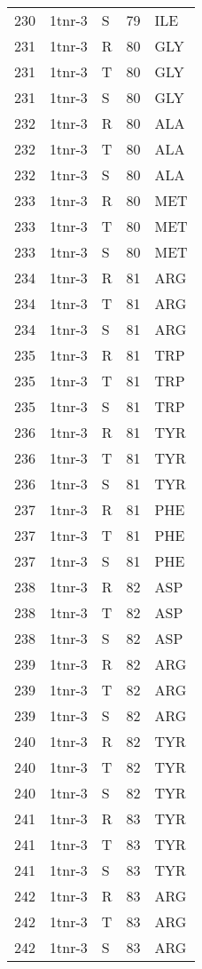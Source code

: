 \begin{tiny}
\begin{longtable}[l]{l|l|l|l|l}
	230 & 1tnr-3 & S & 79 & ILE \\
	231 & 1tnr-3 & R & 80 & GLY \\
	231 & 1tnr-3 & T & 80 & GLY \\
	231 & 1tnr-3 & S & 80 & GLY \\
	232 & 1tnr-3 & R & 80 & ALA \\
	232 & 1tnr-3 & T & 80 & ALA \\
	232 & 1tnr-3 & S & 80 & ALA \\
	233 & 1tnr-3 & R & 80 & MET \\
	233 & 1tnr-3 & T & 80 & MET \\
	233 & 1tnr-3 & S & 80 & MET \\
	234 & 1tnr-3 & R & 81 & ARG \\
	234 & 1tnr-3 & T & 81 & ARG \\
	234 & 1tnr-3 & S & 81 & ARG \\
	235 & 1tnr-3 & R & 81 & TRP \\
	235 & 1tnr-3 & T & 81 & TRP \\
	235 & 1tnr-3 & S & 81 & TRP \\
	236 & 1tnr-3 & R & 81 & TYR \\
	236 & 1tnr-3 & T & 81 & TYR \\
	236 & 1tnr-3 & S & 81 & TYR \\
	237 & 1tnr-3 & R & 81 & PHE \\
	237 & 1tnr-3 & T & 81 & PHE \\
	237 & 1tnr-3 & S & 81 & PHE \\
	238 & 1tnr-3 & R & 82 & ASP \\
	238 & 1tnr-3 & T & 82 & ASP \\
	238 & 1tnr-3 & S & 82 & ASP \\
	239 & 1tnr-3 & R & 82 & ARG \\
	239 & 1tnr-3 & T & 82 & ARG \\
	239 & 1tnr-3 & S & 82 & ARG \\
	240 & 1tnr-3 & R & 82 & TYR \\
	240 & 1tnr-3 & T & 82 & TYR \\
	240 & 1tnr-3 & S & 82 & TYR \\
	241 & 1tnr-3 & R & 83 & TYR \\
	241 & 1tnr-3 & T & 83 & TYR \\
	241 & 1tnr-3 & S & 83 & TYR \\
	242 & 1tnr-3 & R & 83 & ARG \\
	242 & 1tnr-3 & T & 83 & ARG \\
	242 & 1tnr-3 & S & 83 & ARG \\

\end{longtable}
\end{tiny}
